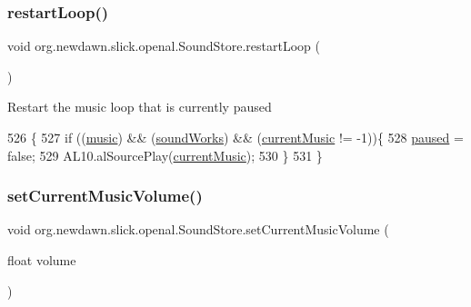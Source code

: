 \subsubsection{\texorpdfstring{restart\+Loop()}{restartLoop()}}
{\footnotesize\ttfamily void org.\+newdawn.\+slick.\+openal.\+Sound\+Store.\+restart\+Loop (\begin{DoxyParamCaption}{ }\end{DoxyParamCaption})\hspace{0.3cm}{\ttfamily [inline]}}

Restart the music loop that is currently paused 
\begin{DoxyCode}
526                               \{
527         \textcolor{keywordflow}{if} ((\mbox{\hyperlink{classorg_1_1newdawn_1_1slick_1_1openal_1_1_sound_store_a7e15ee371935f6d530e4481ac9e2bd7e}{music}}) && (\mbox{\hyperlink{classorg_1_1newdawn_1_1slick_1_1openal_1_1_sound_store_ae563e9c1a01e333dc2350f1450f451fd}{soundWorks}}) && (\mbox{\hyperlink{classorg_1_1newdawn_1_1slick_1_1openal_1_1_sound_store_a533d86a926110a3d75449fa186015f07}{currentMusic}} != -1))\{
528             \mbox{\hyperlink{classorg_1_1newdawn_1_1slick_1_1openal_1_1_sound_store_a44c472fda007e17b19478fc3d77e04e3}{paused}} = \textcolor{keyword}{false};
529             AL10.alSourcePlay(\mbox{\hyperlink{classorg_1_1newdawn_1_1slick_1_1openal_1_1_sound_store_a533d86a926110a3d75449fa186015f07}{currentMusic}});
530         \}
531     \}
\end{DoxyCode}
\mbox{\label{classorg_1_1newdawn_1_1slick_1_1openal_1_1_sound_store_ab3507f6a2b2b1e50d20c80baec859323}} 
\subsubsection{\texorpdfstring{set\+Current\+Music\+Volume()}{setCurrentMusicVolume()}}
{\footnotesize\ttfamily void org.\+newdawn.\+slick.\+openal.\+Sound\+Store.\+set\+Current\+Music\+Volume (\begin{DoxyParamCaption}\item[{float}]{volume }\end{DoxyParamCaption})\hspace{0.3cm}{\ttfamily [inline]}}

